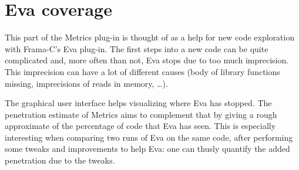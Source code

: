 \documentclass{frama-c-book}
\begin{document}
\section{Eva coverage}

This part of the Metrics plug-in is thought of as a help for new code
exploration with Frama-C's Eva plug-in. The first steps into a new
code can
be quite complicated and, more often than not, Eva stops due to too
much imprecision. This imprecision can have a lot of different causes (body of
library functions missing, imprecisions of reads in memory, \ldots).

The graphical user interface helps visualizing where Eva has
stopped. The penetration estimate of Metrics aims to complement that by giving a
rough approximate of the percentage of code that Eva has
seen. This is especially interesting when comparing two runs of Eva
on the same code, after performing some tweaks and improvements to help
Eva: one can thusly quantify the added penetration due
to the tweaks.





\end{document}

